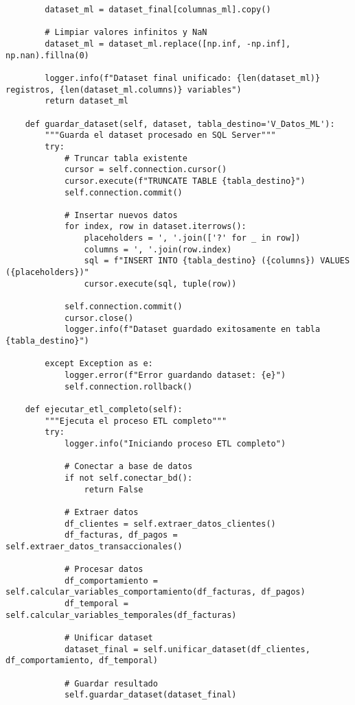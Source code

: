 \begin{verbatim}
        dataset_ml = dataset_final[columnas_ml].copy()
        
        # Limpiar valores infinitos y NaN
        dataset_ml = dataset_ml.replace([np.inf, -np.inf], np.nan).fillna(0)
        
        logger.info(f"Dataset final unificado: {len(dataset_ml)} registros, {len(dataset_ml.columns)} variables")
        return dataset_ml
    
    def guardar_dataset(self, dataset, tabla_destino='V_Datos_ML'):
        """Guarda el dataset procesado en SQL Server"""
        try:
            # Truncar tabla existente
            cursor = self.connection.cursor()
            cursor.execute(f"TRUNCATE TABLE {tabla_destino}")
            self.connection.commit()
            
            # Insertar nuevos datos
            for index, row in dataset.iterrows():
                placeholders = ', '.join(['?' for _ in row])
                columns = ', '.join(row.index)
                sql = f"INSERT INTO {tabla_destino} ({columns}) VALUES ({placeholders})"
                cursor.execute(sql, tuple(row))
            
            self.connection.commit()
            cursor.close()
            logger.info(f"Dataset guardado exitosamente en tabla {tabla_destino}")
            
        except Exception as e:
            logger.error(f"Error guardando dataset: {e}")
            self.connection.rollback()
    
    def ejecutar_etl_completo(self):
        """Ejecuta el proceso ETL completo"""
        try:
            logger.info("Iniciando proceso ETL completo")
            
            # Conectar a base de datos
            if not self.conectar_bd():
                return False
            
            # Extraer datos
            df_clientes = self.extraer_datos_clientes()
            df_facturas, df_pagos = self.extraer_datos_transaccionales()
            
            # Procesar datos
            df_comportamiento = self.calcular_variables_comportamiento(df_facturas, df_pagos)
            df_temporal = self.calcular_variables_temporales(df_facturas)
            
            # Unificar dataset
            dataset_final = self.unificar_dataset(df_clientes, df_comportamiento, df_temporal)
            
            # Guardar resultado
            self.guardar_dataset(dataset_final)
            

\end{verbatim}
